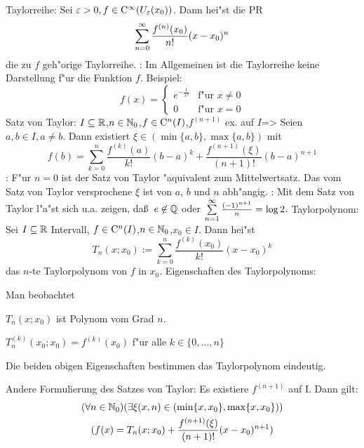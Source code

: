  Taylorreihe:{
  Sei $\varepsilon>0,f\in{\rm C}^\infty(U_\varepsilon(x_0))$. Dann hei"st die PR
  \[\sumn 0 \frac{f^{(n)}(x_0)}{n!}(x-x_0)^n
    \]
  die zu $f$ geh"orige Taylorreihe.
  }
\remark:{
  Im Allgemeinen ist die Taylorreihe keine Darstellung f"ur die Funktion $f$.
  Beispiel: 
  \[f(x)=\begin{cases}
      e^{-\frac 1 {x^2}} 	& \text{f"ur $x\ne 0$} \\ 
      0 			& \text{f"ur $x=0$}
      \end{cases}
    \]
  }
\theorem Satz von Taylor:
  $I\subseteq\mathbb R$,$n\in\mathbb N_0$,$f\in{\rm C}^n(I)$,$f^{(n+1)}$ ex. auf $I$=>{
  Seien $a,b\in I,a\ne b$. Dann existiert $\xi\in(\min\{a,b\},\max\{a,b\})$ mit    
  \[f(b)=\sum_{k=0}^n \frac{f^{(k)}(a)}{k!}(b-a)^k+
         \frac{f^{(n+1)}(\xi)}{(n+1)!}(b-a)^{n+1}
    \]
  }
\remark:{
  F"ur $n=0$ ist der Satz von Taylor "aquivalent zum Mittelwertsatz. 
  Das vom Satz von Taylor versprochene $\xi$ ist von $a$, $b$ und $n$ 
  abh"angig.
  }
\remark:{
  Mit dem Satz von Taylor l"a"st sich u.a. zeigen, da\ss\ $e\not\in\mathbb Q$ 
  oder $\sumn 1 \frac{(-1)^{n+1}}n=\log 2$.
  }
 Taylorpolynom:{
  Sei $I\subseteq\mathbb R$ Intervall, $f\in{\rm C}^n(I)$,$n\in\mathbb N_0$,$x_0\in I$.
  Dann hei"st
  \[T_n(x;x_0):=\sum_{k=0}^n \frac{f^{(k)}(x_0)}{k!}(x-x_0)^k
    \]
  das $n$-te Taylorpolynom von $f$ in $x_0$.
  }
\remark Eigenschaften des Taylorpolynoms:{
  Man beobachtet
  \begin{stmts}
    \item $T_n(x;x_0)$ ist Polynom vom Grad $n$.
    \item $T_n^{(k)}(x_0;x_0)=f^{(k)}(x_0)$ f"ur alle $k\in\{0,\ldots,n\}$
    \item Die beiden obigen Eigenschaften bestimmen das Taylorpolynom eindeutig.
    \end{stmts}
  }
\remark Andere Formulierung des Satzes von Taylor:{
  Es existiere $f^{(n+1)}$ auf I. Dann gilt:
  \begin{multline*}
    (\forall n\in\mathbb N_0)(\exists \xi(x,n)\in(\min\{x,x_0\},\max\{x,x_0\}))\\
    (f(x)=T_n(x;x_0)+\frac{f^{(n+1)}(\xi)}{(n+1)!}(x-x_0)^{n+1})
    \end{multline*}
  }
